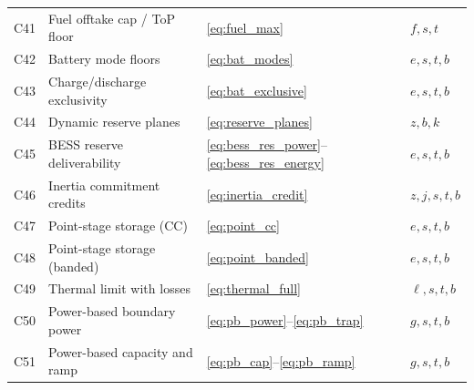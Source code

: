 \begin{table}[t]
\begin{tabular}{@{}clll@{}}
C41 & Fuel offtake cap / ToP floor  & \eqref{eq:fuel_max}         & $f,s,t$ \\
C42 & Battery mode floors           & \eqref{eq:bat_modes}        & $e,s,t,b$ \\
C43 & Charge/discharge exclusivity  & \eqref{eq:bat_exclusive}    & $e,s,t,b$ \\
C44 & Dynamic reserve planes        & \eqref{eq:reserve_planes}   & $z,b,k$ \\
C45 & BESS reserve deliverability   & \eqref{eq:bess_res_power}--\eqref{eq:bess_res_energy} & $e,s,t,b$ \\
C46 & Inertia commitment credits    & \eqref{eq:inertia_credit}   & $z,j,s,t,b$ \\
C47 & Point-stage storage (CC)      & \eqref{eq:point_cc}         & $e,s,t,b$ \\
C48 & Point-stage storage (banded)  & \eqref{eq:point_banded}     & $e,s,t,b$ \\
C49 & Thermal limit with losses     & \eqref{eq:thermal_full}     & $\ell,s,t,b$ \\
C50 & Power-based boundary power    & \eqref{eq:pb_power}--\eqref{eq:pb_trap} & $g,s,t,b$ \\
C51 & Power-based capacity and ramp & \eqref{eq:pb_cap}--\eqref{eq:pb_ramp} & $g,s,t,b$ \\
\bottomrule
\end{tabular}
\end{table}
